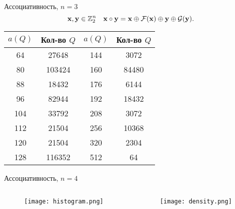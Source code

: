 \begin{frame}{Ассоциативность, $n=3$}
    \[
        \mathbf{x}, \mathbf{y} \in \mathbb{Z}_2^n \quad \mathbf{x} \circ \mathbf{y} = \mathbf{x} \oplus \mathcal{F}(\mathbf{x}) \oplus \mathbf{y} \oplus \mathcal{G}(\mathbf{y}).
    \]


    \begin{center}
        \small{
            \begin{tabular}{|c|c||c|c|}
                \hline
                \rowcolor{Gray}
                $a(Q)$ & Кол-во $Q$ & $a(Q)$ & Кол-во $Q$ \\
                \hline
                64 & 27648 & 144 & 3072\\
                80 & 103424 & 160 & 84480 \\
                88 & 18432 & 176 & 6144\\
                96 & 82944 & 192 & 18432\\
                104 & 33792 & 208 & 3072\\
                112 & 21504 & 256 & 10368\\
                120 & 21504 & 320 & 2304\\
                128 & 116352 & 512 & 64\\
                \hline
            \end{tabular}
        }
    \end{center}
\end{frame}


\begin{frame}{Ассоциативность, $n=4$}
    \begin{columns}[T] %
        \begin{column}{.49\textwidth}
            \begin{figure}[h]
                \centering 
                \texttt{[image: histogram.png]}
            \end{figure}
        \end{column}%
        \hfill%
        \begin{column}{.49\textwidth}
            \begin{figure}[h]
                \centering 
                \texttt{[image: density.png]}
            \end{figure}
        \end{column}%
    \end{columns}  
\end{frame}


